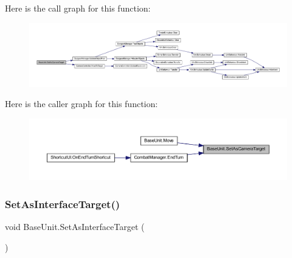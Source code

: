 Here is the call graph for this function\+:
\nopagebreak
\begin{figure}[H]
\begin{center}
\leavevmode
\includegraphics[width=350pt]{class_base_unit_ac4b2eaeb4641fc124d36d413b6193c56_cgraph}
\end{center}
\end{figure}
Here is the caller graph for this function\+:
\nopagebreak
\begin{figure}[H]
\begin{center}
\leavevmode
\includegraphics[width=350pt]{class_base_unit_ac4b2eaeb4641fc124d36d413b6193c56_icgraph}
\end{center}
\end{figure}
\mbox{\label{class_base_unit_abae0a52156648495ea6e8487782f8636}} 
\subsubsection{\texorpdfstring{SetAsInterfaceTarget()}{SetAsInterfaceTarget()}}
{\footnotesize\ttfamily void Base\+Unit.\+Set\+As\+Interface\+Target (\begin{DoxyParamCaption}{ }\end{DoxyParamCaption})}

